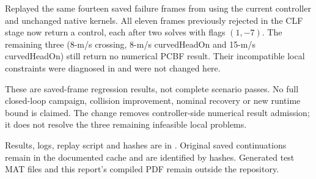 \documentclass[11pt]{article}
\begin{document}
Replayed the same fourteen saved failure frames from
 using the current controller and
unchanged native kernels. All eleven frames previously rejected in the CLF
stage now return a control, each after two solves with flags $(1,-7)$.
The remaining three (8-m/s crossing, 8-m/s curvedHeadOn and 15-m/s curvedHeadOn)
still return no numerical PCBF result. Their incompatible local constraints
were diagnosed in  and were
not changed here.

These are saved-frame regression results, not complete scenario passes.
No full closed-loop campaign, collision improvement, nominal recovery or new
runtime bound is claimed. The change removes controller-side numerical result
admission; it does not resolve the three remaining infeasible local problems.

Results, logs, replay script and hashes are in
. Original saved continuations
remain in the documented cache and are identified by hashes. Generated test
MAT files and this report's compiled PDF remain outside the repository.
\end{document}
